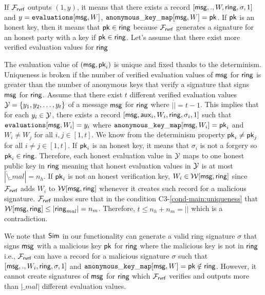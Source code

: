 	If $ \mathcal{F}_{\textsf{rvrf}} $ outputs $ (1,y) $, it means that there exists a record $ [\mathsf{msg}, ., W,\mathsf{ring}, \sigma,1] $ and $ y = \texttt{evaluations}[\mathsf{msg}, W] $, $ \mathtt{anonymous\_key\_map}[\mathsf{msg}, W]  = \mathsf{pk}$.  If $ \mathsf{pk} $ is an honest key, then it means that $ \mathsf{pk} \in \mathsf{ring} $ because $ \mathcal{F}_{\textsf{rvrf}} $ generates a signature for an honest party with a key if $ \mathsf{pk} \in \mathsf{ring} $. Let's assume that there exist more verified evaluation values for $ \mathsf{ring} $
	
	
	The evaluation value of $ (\mathsf{msg}, \mathsf{pk}_i) $ is unique and fixed thanks to the determinism. 
	Uniqueness is broken if the number of verified evaluation values of $ \mathsf{msg} $ for $ \mathsf{ring} $ is greater than the number of anonymous keys that verify a signature that signs $ \mathsf{msg} $ for $ \mathsf{ring} $.
	Assume that there exist $ t$ different verified evaluation values $ {\mathcal{Y}} = \{y_1, y_2, \ldots, y_t\} $ of a message $ \mathsf{msg} $ for $ \mathsf{ring} $ where $ |\ring| = t-1 $. This implies that for each $ y_i \in {\ensuremath{\mathcal{Y}}} $, there exists a  record $ [\mathsf{msg}, \mathsf{aux}_i, W_i,\mathsf{ring},\sigma_i,1] $ such that  $\texttt{evaluations}[\mathsf{msg},W_i] = y_i $ where $ \mathtt{anonymous\_key\_map}[\mathsf{msg},W_i] = \mathsf{pk}_i $ and $ W_i \neq W_j $ for all $ i,j \in [1,t] $. We know from the determinism property $ \mathsf{pk}_i \neq \mathsf{pk}_j $ for all $ i \neq j \in [1,t] $. 
	If $ \mathsf{pk}_i $ is an honest key, it means that $ \sigma_i $ is not a forgery so $ \mathsf{pk}_i \in \mathsf{ring} $. Therefore, each honest evaluation value  in $ {\mathcal{Y}} $ maps to one honest public key in $ \mathsf{ring} $ meaning that honest evaluation values in $ {\mathcal{Y}} $ is at most $ |\ring \setminus \ring_{mal}| = n_h $. If $ \mathsf{pk}_i $ is not an honest verification key, $ W_i \in \mathcal{W}[\mathsf{msg},\mathsf{ring}] $ since $ \mathcal{F}_{\textsf{rvrf}} $ adds $ W_i $ to $ \mathcal{W}[\mathsf{msg}, \mathsf{ring}] $ whenever it creates such record for a malicious signature. $ \mathcal{F}_{\textsf{rvrf}} $ makes sure that in the condition C3-\ref{cond-main:uniqueness} that $ \mathcal{W}[\mathsf{msg},\mathsf{ring}] \leq |\mathsf{ring}_{mal}| = n_m$. Therefore, $ t \leq n_h + n_m = |\ring| $ which is a contradiction.
	
	We note that $ \mathsf{Sim} $ in our functionality can generate a valid ring signature $ \sigma $ that signs $ \mathsf{msg} $ with a malicious key $ \mathsf{pk} $ for $ \mathsf{ring} $ where the malicious key is not in $ \mathsf{ring} $ i.e.,  $ \mathcal{F}_{\textsf{rvrf}} $  can have a record for a malicious signature $ \sigma $ such that $ [\mathsf{msg}, ., W_i,\mathsf{ring},\sigma,1] $ and $ \mathtt{anonymous\_key\_map}[\mathsf{msg},W]  = \mathsf{pk} \notin \mathsf{ring}$. However, it cannot create signatures of $ \mathsf{msg} $ for $ \mathsf{ring} $ which $ \mathcal{F}_{\textsf{rvrf}} $ verifies and outputs more than  $ |\ring_{mal}| $  different evaluation values.  
	

